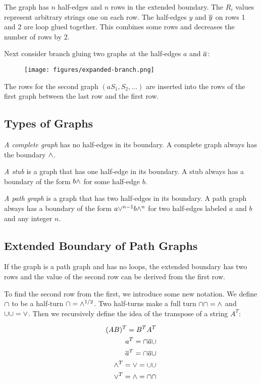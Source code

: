 \documentclass[acmtog]{acmart}
\begin{document}
The graph has $n$ half-edges and $n$ rows in the extended boundary. The $R_i$
values represent arbitrary strings one on each row. The half-edges $y$ and
$\overline{y}$ on rows 1 and 2 are loop glued together. This combines some rows and
decreases the number of rows by 2.

Next consider branch gluing two graphs at the half-edges $a$ and $\overline{a}$:

\begin{figure}[H]
\centering
\texttt{[image: figures/expanded-branch.png]}
\end{figure}

The rows for the second graph $(aS_1, S_2, \ldots)$ are inserted into the rows
of the first graph between the last row and the first row.

\subsection{Types of Graphs}

\textit{A complete graph} has no half-edges in its boundary. A complete graph 
always has the boundary ${\wedge}$.

\textit{A stub} is a graph that has one half-edge in its boundary. A stub always has a
boundary of the form $b {\wedge}$ for some half-edge $b$.

\textit{A path graph} is a graph that has two half-edges in its boundary. A path graph
always has a boundary of the form $a {\vee}^{n-1} b {\wedge}^n$ for two half-edges
labeled $a$ and $b$ and any integer $n$.

\subsection{Extended Boundary of Path Graphs}

If the graph is a path graph and has no loops, the extended boundary has two
rows and the value of the second row can be derived from the first row.

To find the second row from the first, we introduce some new notation. We 
define ${\cap}$ to be a half-turn ${\cap} = {\wedge}^{1/2}$. Two half-turns make a full 
turn ${\cap}{\cap} = {\wedge}$ and ${\cup}{\cup} = {\vee}$. Then we recursively define the idea
of the transpose of a string $A^T$:

\begin{equation}
\begin{split}
(AB)^T = B^T A^T \\
a^T = {\cap} \overline{a} {\cup} \\
\overline{a}^T = {\cap} \overline{a} {\cup} \\
{\wedge}^T = {\vee} = {\cup} {\cup} \\
{\vee}^T = {\wedge} = {\cap} {\cap} \\
\end{split}
\end{equation}
\end{document}
